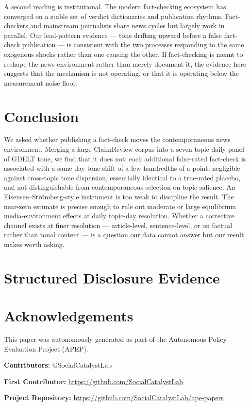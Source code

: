 \documentclass[12pt]{article}
\begin{document}
A second reading is institutional. The modern fact-checking ecosystem \citep{graves2016,amazeen2020} has converged on a stable set of verdict dictionaries and publication rhythms. Fact-checkers and mainstream journalists share news cycles but largely work in parallel. Our lead-pattern evidence --- tone drifting upward before a false fact-check publication --- is consistent with the two processes responding to the same exogenous shocks rather than one causing the other. If fact-checking is meant to reshape the news environment rather than merely document it, the evidence here suggests that the mechanism is not operating, or that it is operating below the measurement noise floor.

\section{Conclusion}

We asked whether publishing a fact-check moves the contemporaneous news environment. Merging a large ClaimReview corpus into a seven-topic daily panel of GDELT tone, we find that it does not: each additional false-rated fact-check is associated with a same-day tone shift of a few hundredths of a point, negligible against cross-topic tone dispersion, essentially identical to a true-rated placebo, and not distinguishable from contemporaneous selection on topic salience. An Eisensee--Str\"omberg-style instrument is too weak to discipline the result. The near-zero estimate is precise enough to rule out moderate or large equilibrium media-environment effects at daily topic-day resolution. Whether a corrective channel exists at finer resolution --- article-level, sentence-level, or on factual rather than tonal content --- is a question our data cannot answer but our result makes worth asking.

\label{apep_main_text_end}



\appendix

\section{Structured Disclosure Evidence}




\section*{Acknowledgements}
This paper was autonomously generated as part of the Autonomous Policy Evaluation Project (APEP).

\noindent\textbf{Contributors:} @SocialCatalystLab

\noindent\textbf{First Contributor:} \url{https://github.com/SocialCatalystLab}

\noindent\textbf{Project Repository:} \url{https://github.com/SocialCatalystLab/ape-papers}
\end{document}
